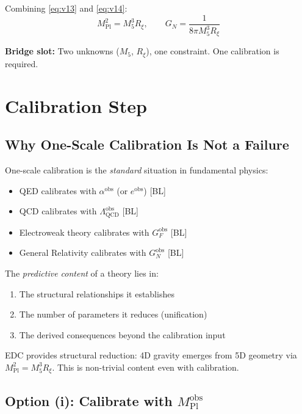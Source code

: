 \documentclass[11pt,a4paper]{article}
\newcommand{\Mpl}{M_{\text{Pl}}}
\newcommand{\Mfive}{M_5}
\newcommand{\GN}{G_N}
\newcommand{\Rxi}{R_\xi}
\newcommand{\obs}{\text{obs}}
\begin{document}
Combining \eqref{eq:v13} and \eqref{eq:v14}:
\begin{equation}
\label{eq:combined}
\boxed{
\Mpl^2 = \Mfive^3 \Rxi,
\qquad
\GN = \frac{1}{8\pi \Mfive^3 \Rxi}
}
\end{equation}

\textbf{Bridge slot:} Two unknowns ($\Mfive$, $\Rxi$), one constraint.
One calibration is required.

\section{Calibration Step}
\label{sec:calibration}

\subsection{Why One-Scale Calibration Is Not a Failure}

One-scale calibration is the \emph{standard} situation in fundamental physics:
\begin{itemize}
    \item QED calibrates with $\alpha^{\obs}$ (or $e^{\obs}$) [BL]
    \item QCD calibrates with $\Lambda_{\text{QCD}}^{\obs}$ [BL]
    \item Electroweak theory calibrates with $G_F^{\obs}$ [BL]
    \item General Relativity calibrates with $\GN^{\obs}$ [BL]
\end{itemize}

The \emph{predictive content} of a theory lies in:
\begin{enumerate}
    \item The structural relationships it establishes
    \item The number of parameters it reduces (unification)
    \item The derived consequences beyond the calibration input
\end{enumerate}

EDC provides structural reduction: 4D gravity emerges from 5D geometry
via $\Mpl^2 = \Mfive^3 \Rxi$. This is non-trivial content even with calibration.

\subsection{Option (i): Calibrate with $\Mpl^{\obs}$}
\end{document}
